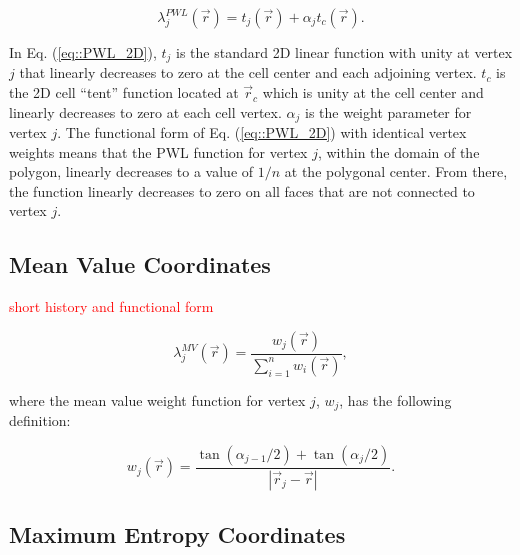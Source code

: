 \documentclass[preprint,10pt]{elsarticle}
\newcommand{\tcr}[1]{\textcolor{red}{#1}}
\begin{document}
\begin{equation}
\label{eq::PWL_2D}
\lambda_j^{PWL} (\vec{r}) = t_j (\vec{r}) + \alpha_j t_c (\vec{r}) .
\end{equation}

\noindent In Eq. (\ref{eq::PWL_2D}), $t_j$ is the standard 2D linear function with unity at vertex $j$ that linearly decreases to zero at the cell center and each adjoining vertex. $t_c$ is the 2D cell ``tent'' function located at $\vec{r}_{c}$ which is unity at the cell center and linearly decreases to zero at each cell vertex. $\alpha_{j}$ is the weight parameter for vertex $j$. The functional form of Eq. (\ref{eq::PWL_2D}) with identical vertex weights means that the PWL function for vertex $j$, within the domain of the polygon, linearly decreases to a value of $1/n$ at the polygonal center. From there, the function linearly decreases to zero on all faces that are not connected to vertex $j$.

\subsection{Mean Value Coordinates}

\tcr{short history and functional form}

\begin{equation}
\label{eq::MV_BF}
\lambda_{j}^{MV} (\vec{r}) = \frac{w_j (\vec{r}) }{\sum\limits_{i=1}^{n} w_i (\vec{r})} ,
\end{equation}

\noindent where the mean value weight function for vertex $j$, $w_j$, has the following definition:

\begin{equation}
\label{eq::MV_weights}
w_j (\vec{r})  = \frac{\tan(\alpha_{j-1} / 2) + \tan(\alpha_j / 2)}{|\vec{r}_j - \vec{r}|}.
\end{equation}

\subsection{Maximum Entropy Coordinates}
\end{document}
